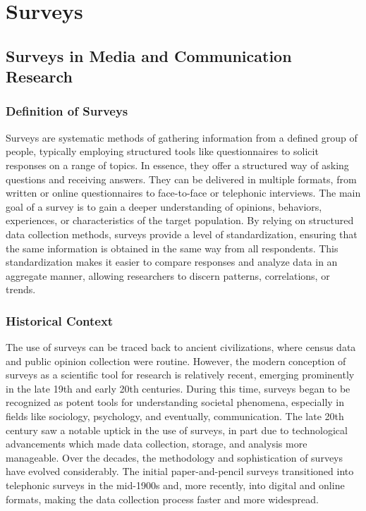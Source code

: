 \documentclass[
  b5paper]{book}
\begin{document}
\hypertarget{surveys-1}{%
\chapter{Surveys}\label{surveys-1}}

\hypertarget{surveys-in-media-and-communication-research}{%
\section{Surveys in Media and Communication Research}\label{surveys-in-media-and-communication-research}}

\hypertarget{definition-of-surveys}{%
\subsection*{Definition of Surveys}\label{definition-of-surveys}}

Surveys are systematic methods of gathering information from a defined group of people, typically employing structured tools like questionnaires to solicit responses on a range of topics. In essence, they offer a structured way of asking questions and receiving answers. They can be delivered in multiple formats, from written or online questionnaires to face-to-face or telephonic interviews. The main goal of a survey is to gain a deeper understanding of opinions, behaviors, experiences, or characteristics of the target population. By relying on structured data collection methods, surveys provide a level of standardization, ensuring that the same information is obtained in the same way from all respondents. This standardization makes it easier to compare responses and analyze data in an aggregate manner, allowing researchers to discern patterns, correlations, or trends.

\hypertarget{historical-context}{%
\subsection*{Historical Context}\label{historical-context}}

The use of surveys can be traced back to ancient civilizations, where census data and public opinion collection were routine. However, the modern conception of surveys as a scientific tool for research is relatively recent, emerging prominently in the late 19th and early 20th centuries. During this time, surveys began to be recognized as potent tools for understanding societal phenomena, especially in fields like sociology, psychology, and eventually, communication. The late 20th century saw a notable uptick in the use of surveys, in part due to technological advancements which made data collection, storage, and analysis more manageable. Over the decades, the methodology and sophistication of surveys have evolved considerably. The initial paper-and-pencil surveys transitioned into telephonic surveys in the mid-1900s and, more recently, into digital and online formats, making the data collection process faster and more widespread.
\end{document}
